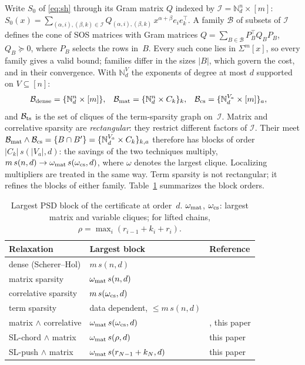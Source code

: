 \documentclass[smallextended]{svjour3}
\newcommand{\N}{\mathbb{N}}
\newcommand{\SOS}{\Sigma}
\newcommand{\cB}{\mathcal{B}}
\newcommand{\cI}{\mathcal{I}}
\newcommand{\sz}[2]{s(#1,#2)}
\begin{document}
Write $S_0$ of \eqref{eq:sh} through its Gram matrix $Q$ indexed by
$\cI=\N^n_d\times[m]$:
$S_0(x)=\sum_{(\alpha,i),(\beta,k)\in\cI}Q_{(\alpha,i),(\beta,k)}\,
x^{\alpha+\beta}e_ie_k^\top$. A family $\cB$ of subsets of $\cI$ defines
the cone of SOS matrices with Gram matrices $Q=\sum_{B\in\cB}P_B^\top
Q_BP_B$, $Q_B\succeq0$, where $P_B$ selects the rows in~$B$. Every such cone
lies in $\SOS^m[x]$, so every family gives a valid bound; families differ
in the sizes $|B|$, which govern the cost, and in their convergence. With $\N^V_d$ the exponents of degree at
most $d$ supported on $V\subseteq[n]$:
\begin{align*}
\cB_{\rm dense}&=\{\N^n_d\times[m]\}, &
\cB_{\rm mat}&=\{\N^n_d\times C_k\}_k, &
\cB_{\rm cs}&=\{\N^{V_a}_d\times[m]\}_a,
\end{align*}
and $\cB_{\rm ts}$ is the set of cliques of the term-sparsity graph
on~$\cI$. Matrix and correlative sparsity are \emph{rectangular}: they
restrict different factors of $\cI$. Their meet
$\cB_{\rm mat}\wedge\cB_{\rm cs}=\{B\cap B'\}=\{\N^{V_a}_d\times C_k\}_{k,a}$
therefore has blocks of order $|C_k|\,\sz{|V_a|}{d}$: the savings of the two
techniques multiply, $m\,\sz{n}{d}\to\omega_{\rm mat}\,\sz{\omega_{\rm
cs}}{d}$, where $\omega$ denotes the largest clique. Localizing multipliers
are treated in the same way. Term sparsity is not rectangular; it refines
the blocks of either family. Table~\ref{tab:sizes} summarizes the block
orders.

\begin{table}[t]
\caption{Largest PSD block of the certificate at order~$d$. $\omega_{\rm
mat}$, $\omega_{\rm cs}$: largest matrix and variable cliques; for lifted
chains, $\rho=\max_i(r_{i-1}+k_i+r_i)$.}
\label{tab:sizes}
\centering\small
\begin{tabular}{@{}lll@{}}
\toprule
Relaxation & Largest block & Reference\\
\midrule
dense (Scherer--Hol) & $m\,\sz{n}{d}$ & \cite{SchererHol2006,HenrionLasserre2006}\\
matrix sparsity & $\omega_{\rm mat}\,\sz{n}{d}$ & \cite{ZhengFantuzzi2023}\\
correlative sparsity & $m\,\sz{\omega_{\rm cs}}{d}$ & \cite{KojimaMuramatsu2009}\\
term sparsity & data dependent, $\le m\,\sz{n}{d}$ & \cite{MillerWangGuo2026}\\
matrix $\wedge$ correlative & $\omega_{\rm mat}\,\sz{\omega_{\rm cs}}{d}$ & \cite{MillerWangGuo2026}, this paper\\
SL-chord $\wedge$ matrix & $\omega_{\rm mat}\,\sz{\rho}{d}$ & this paper\\
SL-push $\wedge$ matrix & $\omega_{\rm mat}\,\sz{r_{N-1}+k_N}{d}$ & this paper\\
\bottomrule
\end{tabular}
\end{table}
\end{document}
